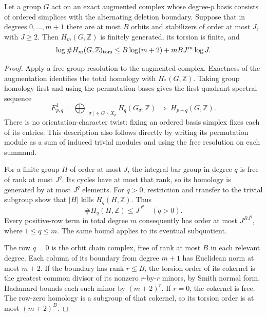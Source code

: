 \begin{srlemma}\label{lem:sr-integral-action-bound}
Let a group \(G\) act on an exact augmented complex whose degree-\(p\)
basis consists of ordered simplices with the alternating deletion
boundary. Suppose that in degrees \(0,\ldots,m+1\) there are at most
\(B\) orbits and stabilizers of order at most \(J\), with \(J\geq2\).
Then \(H_m(G,\mathbb Z)\) is finitely generated, its torsion is finite,
and
\begin{equation}\label{eq:sr-integral-action-bound}
 \log\#H_m(G,\mathbb Z)_{\rm tors}
                 \leq B\log(m+2)+mBJ^m\log J .
\end{equation}
\end{srlemma}
\begin{proof}
Apply a free group resolution to the augmented complex.
Exactness of the augmentation identifies the total homology with
\(H_*(G,\mathbb Z)\). Taking group homology first and using the
permutation bases gives the first-quadrant spectral sequence
\[
 E^1_{p,q}=\bigoplus_{[\sigma]\in G\backslash X_p}
                    H_q(G_\sigma,\mathbb Z)
                  \ \Longrightarrow\ H_{p+q}(G,\mathbb Z).
\]
There is no orientation-character twist: fixing an ordered basis
simplex fixes each of its entries.
This description also follows directly by writing its permutation
module as a sum of induced trivial modules and using the free
resolution on each summand.

For a finite group \(H\) of order at most \(J\), the integral
bar group in degree \(q\) is free of rank at most \(J^q\).
Its cycles have at most that rank, so its homology is generated by
at most \(J^q\) elements.
For \(q>0\), restriction and transfer to the trivial subgroup show
that \(|H|\) kills \(H_q(H,\mathbb Z)\).
Thus
\[
                  \#H_q(H,\mathbb Z)\leq J^{J^q}\quad(q>0).
\]
Every positive-row term in total degree \(m\) consequently has order
at most \(J^{BJ^q}\), where \(1\leq q\leq m\).
The same bound applies to its eventual subquotient.

The row \(q=0\) is the orbit chain complex, free of rank at most
\(B\) in each relevant degree.
Each column of its boundary from degree \(m+1\) has Euclidean norm
at most \(m+2\).
If the boundary has rank \(r\leq B\), the torsion order of its
cokernel is the greatest common divisor of its nonzero
\(r\)-by-\(r\) minors, by Smith normal form.
Hadamard bounds each such minor by \((m+2)^r\).
If \(r=0\), the cokernel is free.
The row-zero homology is a subgroup of that cokernel, so its torsion
order is at most \((m+2)^B\).


\end{proof}
